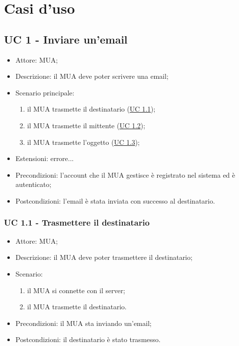 \section{Casi d'uso}

    \subsection{UC 1 - Inviare un'email} \label{sec: 1}
    \begin{itemize}
        \item Attore: MUA;
        \item Descrizione: il MUA deve poter scrivere una email;
        \item Scenario principale:
            \begin{enumerate}
            \item il MUA trasmette il destinatario (\hyperref[sec: UC 1.1]{UC 1.1});
            \item il MUA trasmette il mittente (\hyperref[sec: UC 1.2]{UC 1.2});
            \item il MUA trasmette l'oggetto (\hyperref[sec: UC 1.3]{UC 1.3});
            \end{enumerate}
        \item Estensioni: errore... %
        \item Precondizioni: l’account che il MUA gestisce è registrato nel sistema ed è autenticato;
        \item Postcondizioni: l'email è stata inviata con successo al destinatario.
    \end{itemize}

    \subsubsection{UC 1.1 - Trasmettere il destinatario} \label{sec: UC 1.1}
    \begin{itemize}
        \item Attore: MUA;
        \item Descrizione: il MUA deve poter trasmettere il destinatario;
        \item Scenario:
        \begin{enumerate}
        \item il MUA si connette con il server;
        \item il MUA trasmette il destinatario.
        \end{enumerate}
        \item Precondizioni: il MUA sta inviando un'email;
        \item Postcondizioni: il destinatario è stato trasmesso.
    \end{itemize}

